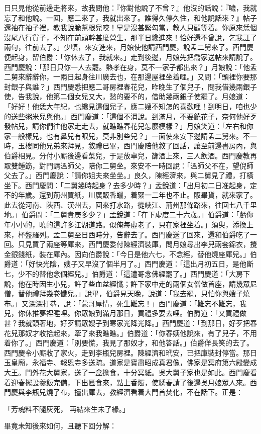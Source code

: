 日只見他從前邊走將來，故我問他：『你對他說了不曾？』他沒的話說：『噦，我就忘了和他說。一回，應二來了，我就出來了。誰得久停久住，和他說話來？』帖子還袖在袖子裡，教我說脆幫根兒咬！早是沒甚緊勾當，教人只顧等着。你原來恁個沒尾八行貨子，不知在前頭幹甚麼營生，那半日纔進來！恰好還不曾說，乞我訌了兩句，往前去了。」少頃，來安進來，月娘使他請西門慶，說孟二舅來了。西門慶便起身，留伯爵：「你休去了，我就來。」走到後邊，月娘先把喬家送帖來請說了。西門慶說：「那日只你一人去罷。熱孝在身，莫不一家子都出來？」月娘說：「他孟二舅來辭辭你，一兩日起身往川廣去也，在那邊屋裡坐着哩。」又問：「頭裡你要那封銀子與誰？」西門慶悉把應二哥房裡春花兒，昨晚生了個兒子，問我借幾兩銀子使，告我說，他第二個女兒又大，愁的要不的，借助幾兩銀子使罷了。月娘道：「好好！他恁大年紀，也纔見這個兒子，應二嫂不知怎的喜歡哩！到明日，咱也少的送些粥米兒與他。」西門慶道：「這個不消說。到滿月，不要饒花子，奈何他好歹發帖兒，請你們往他家走走去，就瞧瞧春花兒怎麼模樣？」月娘笑道：「左右和你家一般樣兒，也有鼻兒有眼兒，莫非別些兒？」一面使來安下邊請孟二舅來。不一時，玉樓同他兄弟來拜見，敘禮已畢，西門慶陪他敘了回話，讓至前邊書房內，與伯爵相見。分付小廝後邊看菜兒，于是放卓兒，篩酒上來，三人飲酒。西門慶教再取雙鍾筯，對門請溫師父，陪你二舅坐。來安不一時回說：「溫師父不在，望倪師父去了。」西門慶說：「請你姐夫來坐坐。」良久，陳經濟來，與二舅見了禮，打橫坐下。西門慶問：「二舅幾時起身？去多少時？」孟銳道：「出月初二日准起身，定不的年歲。還到荊州買紙，川廣販香蠟，着緊一二年也不止。販畢貨，就來家了。此去從河南、陝西、漢州去，回來打水路，從峽江、荊州那條路來，往回七八千里地。」伯爵問：「二舅貴庚多少？」孟銳道：「在下虛度二十六歲。」伯爵道：「虧你年小小的，曉的這許多江湖道路。似俺每虛老了，只在家裡坐着。」須臾，添換上來，杯盤羅列。孟二舅至日西時分，告辭去了。西門慶送了回來，還和伯爵吃了一回。只見買了兩座等庫來，西門慶委付陳經濟裝庫，問月娘尋出李兒兩套錦衣，攪金銀錢紙，裝在庫內。因向伯爵說：「今日是他六七，不念經，替他燒座庫兒。」伯爵道：「好快光陰，嫂子又早沒了個半月了。」西門慶道：「這出月初五日，是他斷七，少不的替他念個經兒。」伯爵道：「這遭哥念佛經罷了。」西門慶道：「大房下說，他在時因生小兒，許了些血盆經懺；許下家中走的兩個女僧做首座，請幾眾尼僧，替他禮拜幾卷懺兒。」說畢，伯爵見天晚，說道：「我去罷，只怕你與嫂子燒布。」又深深打恭，說：「蒙哥厚情，死生難忘！」西門慶道：「難忘不難忘，我兒，你休推夢裡睡哩。你眾娘到滿月那日，買禮多要去哩。伯爵道：「又買禮做甚？我就頭著地，好歹請眾嫂子到寒家光降光降。」西門慶道：「到那日，好歹把春花兒那奴才收拾起來，牽了來我瞧瞧。」伯爵道：「你春姨他說來，有了兒子，不用着你了。」西門慶道：「別要慌，我見了那奴才，和他答話。」伯爵佯長笑的去了。西門慶令小廝收了家火，走到李瓶兒房裡。陳經濟和玳安，已把庫裝封停當。那日玉皇廟，永福寺、報恩寺多送疏。道家是寶肅昭成真君像，佛家是冥府第六殿變成大王。門外花大舅家，送了一盒擔食，十分冥紙。吳大舅子家也是如此。西門慶看着迎春擺設羹飯完備，下出匾食來，點上香燭，使綉春請了後邊吳月娘眾人來。西門慶與李瓶兒燒了布，擡出庫去，教經濟看着大門首焚化，不在話下。正是：

「芳魂料不隨灰死，  再結來生未了緣。」

畢竟未知後來如何，且聽下回分解：
